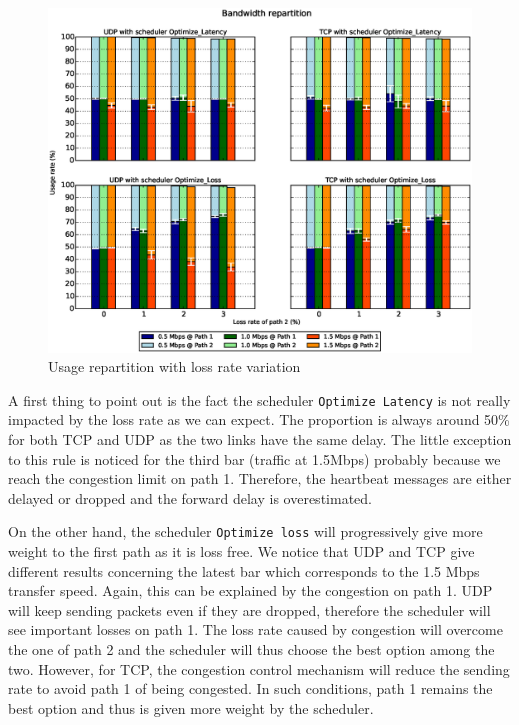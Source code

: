 \begin{figure}[!ht]
\centering
\includegraphics[width=\textwidth]{images/xp/graph2.eps}
\caption{Usage repartition with loss rate variation}
\label{fig:dynloss}
\end{figure}

A first thing to point out is the fact the scheduler \texttt{Optimize Latency} is not really impacted by the loss rate as we can expect. The proportion is always around 50\% for both TCP and UDP as the two links have the same delay. The little exception to this rule is noticed for the third bar (traffic at 1.5Mbps) probably because we reach the congestion limit on path 1. Therefore, the heartbeat messages are either delayed or dropped and the forward delay is overestimated.

On the other hand, the scheduler \texttt{Optimize loss} will progressively give more weight to the first path as it is loss free. We notice that UDP and TCP give different results concerning the latest bar which corresponds to the 1.5 Mbps transfer speed. Again, this can be explained by the congestion on path 1. UDP will keep sending packets even if they are dropped, therefore the scheduler will see important losses on path 1. The loss rate caused by congestion will overcome the one of path 2 and the scheduler will thus choose the best option among the two. However, for TCP, the congestion control mechanism will reduce the sending rate to avoid path 1 of being congested. In such conditions, path 1 remains the best option and thus is given more weight by the scheduler.


